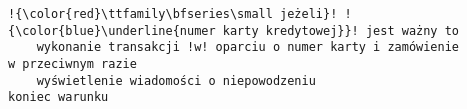 \documentclass[a4paper,12pt]{book}
\begin{document}
\begin{lstlisting}
!{\color{red}\ttfamily\bfseries\small jeżeli}! !{\color{blue}\underline{numer karty kredytowej}}! jest ważny to
	wykonanie transakcji !w! oparciu o numer karty i zamówienie
w przeciwnym razie
	wyświetlenie wiadomości o niepowodzeniu
koniec warunku
\end{lstlisting}
\end{document}
